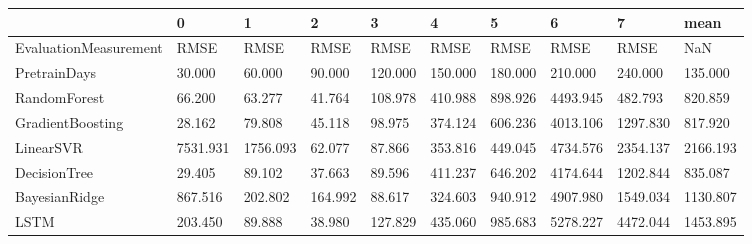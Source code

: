 \begin{tabular}{llllllllll}
\toprule
{} &        0 &        1 &       2 &       3 &       4 &       5 &        6 &        7 &     mean \\
\midrule
EvaluationMeasurement &     RMSE &     RMSE &    RMSE &    RMSE &    RMSE &    RMSE &     RMSE &     RMSE &      NaN \\
PretrainDays          &   30.000 &   60.000 &  90.000 & 120.000 & 150.000 & 180.000 &  210.000 &  240.000 &  135.000 \\
RandomForest          &   66.200 &   63.277 &  41.764 & 108.978 & 410.988 & 898.926 & 4493.945 &  482.793 &  820.859 \\
GradientBoosting      &   28.162 &   79.808 &  45.118 &  98.975 & 374.124 & 606.236 & 4013.106 & 1297.830 &  817.920 \\
LinearSVR             & 7531.931 & 1756.093 &  62.077 &  87.866 & 353.816 & 449.045 & 4734.576 & 2354.137 & 2166.193 \\
DecisionTree          &   29.405 &   89.102 &  37.663 &  89.596 & 411.237 & 646.202 & 4174.644 & 1202.844 &  835.087 \\
BayesianRidge         &  867.516 &  202.802 & 164.992 &  88.617 & 324.603 & 940.912 & 4907.980 & 1549.034 & 1130.807 \\
LSTM                  &  203.450 &   89.888 &  38.980 & 127.829 & 435.060 & 985.683 & 5278.227 & 4472.044 & 1453.895 \\
\bottomrule
\end{tabular}
